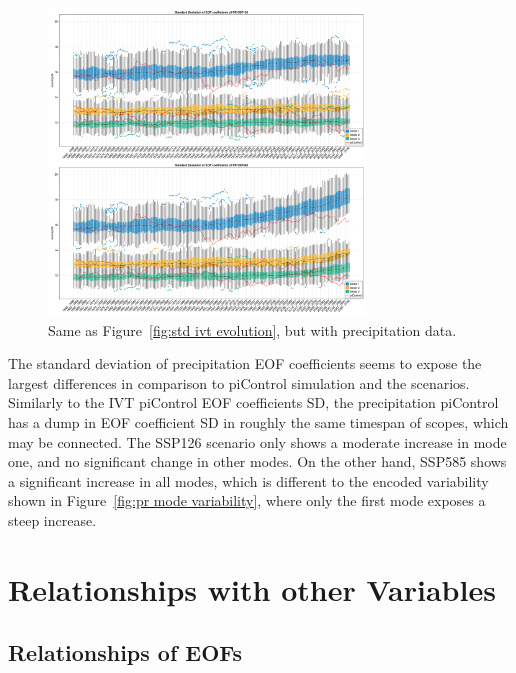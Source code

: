\begin{figure}
  \begin{center}
    \includegraphics[width=0.75\textwidth]{figures/std_pr_50seasons_tempmodescale_3modes.png}
  \end{center}
  \caption{Same as Figure~\ref{fig:std ivt evolution}, but with precipitation data.}
  \label{fig:std pr evolution}
\end{figure}

The standard deviation of precipitation EOF coefficients seems to expose the largest differences in comparison to piControl simulation and the scenarios. 
Similarly to the IVT piControl EOF coefficients SD, the precipitation piControl has a dump in EOF coefficient SD in roughly the same timespan of scopes, which may be connected. 
The SSP126 scenario only shows a moderate increase in mode one, and no significant change in other modes. 
On the other hand, SSP585 shows a significant increase in all modes, which is different to the encoded variability shown in Figure~\ref{fig:pr mode variability}, where only the first mode exposes a steep increase. 



\section{Relationships with other Variables}



\subsection{Relationships of EOFs}


